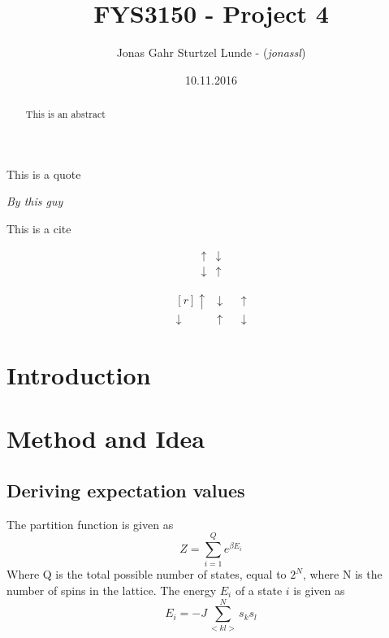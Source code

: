 \documentclass[10pt,a4paper]{article}
\begin{document}
\title{FYS3150 - Project 4}
\author{
	\begin{tabular}{rl}
		Jonas Gahr Sturtzel Lunde - (\textit{jonassl})\\
	\end{tabular}}
\date{10.11.2016}
\maketitle



\setlength{\epigraphwidth}{0.75\textwidth}
\renewcommand{\epigraphflush}{center}
\renewcommand{\beforeepigraphskip}{50pt}
\renewcommand{\afterepigraphskip}{100pt}
\renewcommand{\epigraphsize}{\normalsize}
\epigraph{This is a quote}
	{\textit{By this guy}}



\begin{abstract}
\noindent
This is an abstract
\end{abstract}
\pagebreak



This is a cite\cite{lecture_notes}

\[
\begin{matrix*}
\uparrow & \downarrow \\
\downarrow & \uparrow
\end{matrix*}
\]

\[
\begin{matrix*}[r]
\uparrow & \downarrow & & \uparrow \\
\downarrow & \uparrow &	& \downarrow
\end{matrix*}
\]

\section{Introduction}


\section{Method and Idea}
\subsection{Deriving expectation values}
The partition function is given as
\begin{equation}\label{eqn:partition}
Z = \sum\limits_{i=1}^Q e^{\beta E_i}
\end{equation}
Where Q is the total possible number of states, equal to $2^N$, where N is the number of spins in the lattice. The energy $E_i$ of a state $i$ is given as
\begin{equation}
E_i = -J \sum\limits_{<kl>}^N s_k s_l
\end{equation}
\end{document}

